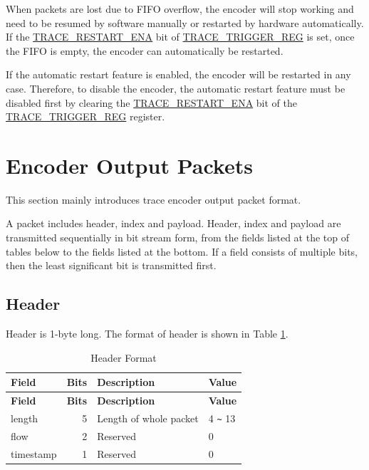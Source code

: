 \documentclass[main\_\_EN.tex]{subfiles}
\begin{document}
When packets are lost due to FIFO overflow, the encoder will stop working and need to be resumed by software manually or restarted by hardware automatically. If the \hyperref[fielddesc:TRACERESTARTENA]{TRACE\_RESTART\_ENA} bit of \hyperref[regdesc:TRACETRIGGERREG]{TRACE\_TRIGGER\_REG} is set, once the FIFO is empty, the encoder can automatically be restarted.

If the automatic restart feature is enabled, the encoder will be restarted in any case. Therefore, to disable the encoder, the automatic restart feature must be disabled first by clearing the \hyperref[fielddesc:TRACERESTARTENA]{TRACE\_RESTART\_ENA} bit of the \hyperref[regdesc:TRACETRIGGERREG]{TRACE\_TRIGGER\_REG} register.


\section{Encoder Output Packets}
\label{sec:riscvtracenc-packetes}

This section mainly introduces \chipname{} trace encoder output packet format.


A packet includes header, index and payload. Header, index and payload are transmitted sequentially in bit stream form, from the fields listed at the top of tables below to the fields listed at the bottom. If a field consists of multiple bits, then the least significant bit is transmitted first.


\subsection{Header}

Header is 1-byte long. The format of header is shown in Table \ref{tab:header}.


\begin{longtable}[c]{ |l|r|l|l| }
    \caption{Header Format}
    \label{tab:header}
    \\\hline\rowcolor{lightgray}
    \textbf{Field} & \textbf{Bits} & \textbf{Description} & \textbf{Value}\\\hline
    \endfirsthead
    \textbf{Field} & \textbf{Bits} & \textbf{Description} & \textbf{Value}\\\hline
    \endhead
    \endfoot
    \endlastfoot

    length & 5 & Length of whole packet & 4 \verb+~+ 13 \\\hline
    flow & 2 & Reserved & 0 \\\hline
    timestamp & 1 & Reserved & 0 \\\hline
 \end{longtable}
\end{document}
